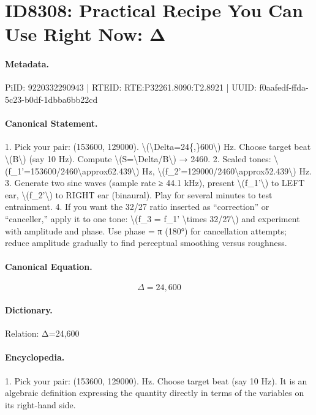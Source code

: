 \section*{ID8308: Practical Recipe You Can Use Right Now: Δ}
\paragraph{Metadata.}
PiID: 9220332290943 | RTEID: RTE:P32261.8090:T2.8921 | UUID: f0aafedf-ffda-5c23-b0df-1dbba6bb22cd

\paragraph{Canonical Statement.}
1. Pick your pair: (153600, 129000). \textbackslash{}(\textbackslash{}Delta=24\{,\}600\textbackslash{}) Hz. Choose target beat \textbackslash{}(B\textbackslash{}) (say 10 Hz). Compute \textbackslash{}(S=\textbackslash{}Delta/B\textbackslash{}) → 2460. 2. Scaled tones: \textbackslash{}(f\_1'=153600/2460\textbackslash{}approx62.439\textbackslash{}) Hz, \textbackslash{}(f\_2'=129000/2460\textbackslash{}approx52.439\textbackslash{}) Hz. 3. Generate two sine waves (sample rate ≥ 44.1 kHz), present \textbackslash{}(f\_1'\textbackslash{}) to LEFT ear, \textbackslash{}(f\_2'\textbackslash{}) to RIGHT ear (binaural). Play for several minutes to test entrainment. 4. If you want the 32/27 ratio inserted as “correction” or “canceller,” apply it to one tone: \textbackslash{}(f\_3 = f\_1' \textbackslash{}times 32/27\textbackslash{}) and experiment with amplitude and phase. Use phase = π (180°) for cancellation attempts; reduce amplitude gradually to find perceptual smoothing versus roughness.

\paragraph{Canonical Equation.}
\[
\Delta=24{,}600
\]

\paragraph{Dictionary.}
Relation: Δ=24,600

\paragraph{Encyclopedia.}
1. Pick your pair: (153600, 129000). Hz. Choose target beat (say 10 Hz). It is an algebraic definition expressing the quantity directly in terms of the variables on its right-hand side.
